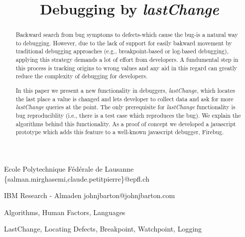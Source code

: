 \documentclass[preprint]{sigplanconf}
\begin{document}
\copyrightdata{[to be supplied]} 

\preprintfooter{}   %

\title{Debugging by \textit{lastChange}}
\subtitle{}

           {Ecole Polytechnique F\'ed\'erale de Lausanne}
           {\{salman.mirghasemi,claude.petitpierre\}@epfl.ch}

           {IBM Research - Almaden}
           {johnjbarton@johnjbarton.com}

\maketitle

\begin{abstract}
Backward search from bug symptoms to defects-which cause the bug-is a natural way to debugging. However, due to the lack of support for easily bakward movement by  traditional debugging approaches (e.g., breakpoint-based or log-based debugging), applying this strategy demands a lot of effort from developers. A fundumental step in this process is tracking origins to wrong values and any aid in this regard can greatly reduce the complexity of debugging for developers.

In this paper we present a new functionality in debuggers, \textit{lastChange}, which locates the last place a value is changed and lets developer to collect data and ask for more \textit{lastChange} queries at the point. The only prerequisite for \textit{lastChange} functionality is bug reproduciblity (i.e., there is a test case which reproduces the bug). We explain the algorithms behind this functionality. As a proof of concept we developed a javascript prototype which adds this feature to a well-known javascript debugger, Firebug. 

\end{abstract}


\terms
Algorithms, Human Factors, Languages

\keywords
LastChange, Locating Defects, Breakpoint, Watchpoint, Logging
\end{document}
